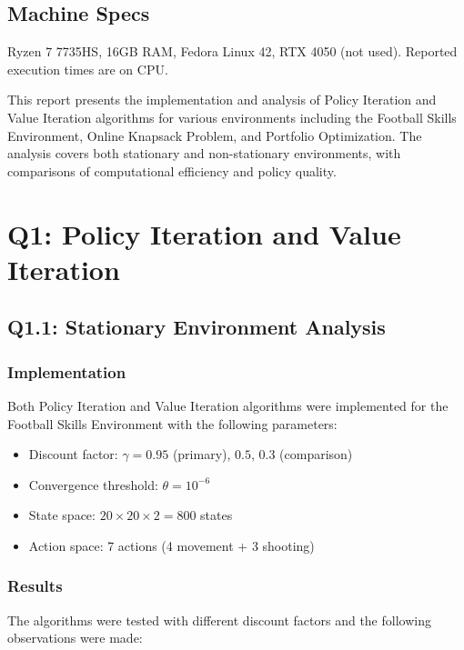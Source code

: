 \documentclass[12pt]{article}
\begin{document}
\subsection*{Machine Specs}
Ryzen 7 7735HS, 16GB RAM, Fedora Linux 42, RTX 4050 (not used). Reported execution times are on CPU.

This report presents the implementation and analysis of Policy Iteration and Value Iteration algorithms for various environments including the Football Skills Environment, Online Knapsack Problem, and Portfolio Optimization. The analysis covers both stationary and non-stationary environments, with comparisons of computational efficiency and policy quality.

\section{Q1: Policy Iteration and Value Iteration}

\subsection{Q1.1: Stationary Environment Analysis}

\subsubsection{Implementation}

Both Policy Iteration and Value Iteration algorithms were implemented for the Football Skills Environment with the following parameters:
\begin{itemize}
    \item Discount factor: $\gamma = 0.95$ (primary), $0.5$, $0.3$ (comparison)
    \item Convergence threshold: $\theta = 10^{-6}$
    \item State space: $20 \times 20 \times 2 = 800$ states
    \item Action space: 7 actions (4 movement + 3 shooting)
\end{itemize}

\subsubsection{Results}

The algorithms were tested with different discount factors and the following observations were made:
\end{document}
